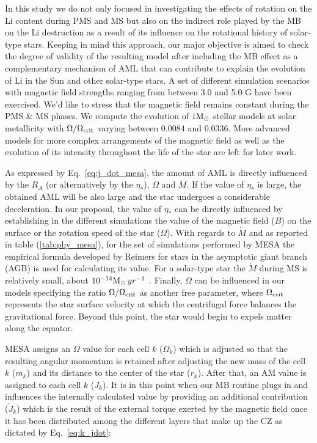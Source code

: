 \documentclass[fleqn,usenatbib]{mnras}
\begin{document}
{{In this study we do not only focused in investigating the effects of rotation on the Li content during PMS and MS but also on the indirect role played by the MB on the Li destruction as a result of its influence on the rotational history of solar-type stars. Keeping in mind this approach, our major objective is aimed to check the degree of validity of the resulting model after including the MB effect as a complementary mechanism of AML that can contribute to explain the evolution of Li in the Sun and other solar-type stars. A set of different simulation scenarios with magnetic field strengths ranging from between 3.0 and 5.0 G have been exercised. We'd like to stress that the magnetic field remains constant during the PMS \& MS phases. We compute the evolution of $1\mathrm{M}_\odot$ stellar models at solar metallicity with $\Omega / \Omega_{\mathrm{crit}}$ varying between $0.0084$ and $0.0336$. More advanced models for more complex arrangements of the magnetic field as well as the evolution of its intensity throughout the life of the star are left for later work.\par


As expressed by Eq.~\ref{eq:j_dot_mesa}, the amount of AML is directly influenced by the $R_A$ (or alternatively by the $\eta_*$), $\Omega$ and $\Dot{M}$. If the value of $\eta_*$ is large, the obtained AML will be also large and the star undergoes a considerable deceleration. In our proposal, the value of $\eta_*$ can be directly influenced by establishing in the different simulations the value of the magnetic field ($B$) on the surface or the rotation speed of the star ($\Omega$). With regards to $\Dot{M}$ and as reported in table (\ref{tab:phy_mesa}), for the set of simulations performed by MESA the empirical formula developed by Reimers \citep{Reimers1975} for stars in the asymptotic giant branch (AGB) is used for calculating its value. For a solar-type star the $\Dot{M}$ during MS is relatively small, about  $10^{-14}\mathrm{M}_\odot \, yr^{-1}$ \citep{Noerdlinger2008}. Finally, $\Omega$ can be influenced in our models specifying the ratio $\Omega / \Omega_{\mathrm{crit}}$ as another free parameter, where  $\Omega_{\mathrm{crit}}$ represents the star surface velocity at which the centrifugal force balances  the gravitational force. Beyond this point, the star would begin to expels matter along the equator.\par

MESA assigns an $\Omega$ value for each cell $k$ ($\Omega_k$) which is adjusted so that the resulting angular momentum is retained after adjusting the new mass of the cell $k$ ($m_k$) and its distance to the center of the star ($r_k$). After that, an AM value is assigned to each cell $k$ ($J_k$). It is in this point when our MB routine plugs in and influences the internally calculated value by providing an additional contribution ($\Dot{J}_{k}$) which is the result of the external torque exerted by the magnetic field once it has been distributed among the different layers that make up the CZ as dictated by Eq.~\ref{eq:k_jdot}:\par
 
}}
\end{document}
